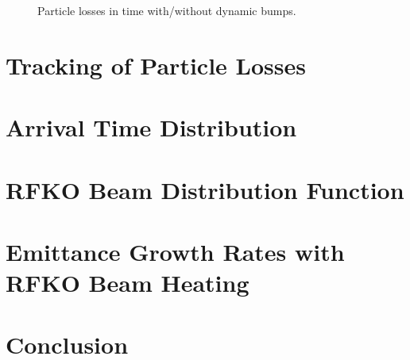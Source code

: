 \documentclass[aps,prstab,onecolumn,preprint,endfloats,11pt]{revtex4-1}
\begin{document}
\begin{figure}[!tbp]
  \caption{\label{fig:bump4}Particle losses in time with/without dynamic bumps.}
\end{figure}

\section{\label{sec:loss}Tracking of Particle Losses}


\clearpage

\section{\label{sec:arrival}Arrival Time Distribution}

\section{\label{sec:rfko}RFKO Beam Distribution Function}

\section{\label{sec:emit}Emittance Growth Rates with RFKO Beam Heating}

\section{\label{sec:conclusion}Conclusion}
\end{document}
